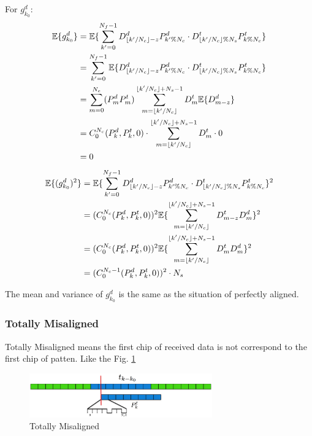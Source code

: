 \documentclass[a4paper]{article}
\begin{document}
For $g^d_{k_0}$:
\begin{align}
	\mathbb{E} \{g^d_{k_0}\} 
	&= \mathbb{E} \{\sum_{k'=0}^{N_f-1} D^d_{\lfloor k'/N_c\rfloor-z} P^d_{k'\%N_c} \cdot D^t_{\lfloor k'/N_c\rfloor\%N_s} P^t_{k\%N_c} \}\\
	&= \sum_{k'=0}^{N_f-1} \mathbb{E} \{ D^d_{\lfloor k'/N_c\rfloor-z} P^d_{k'\%N_c} \cdot D^t_{\lfloor k'/N_c\rfloor\%N_s} P^t_{k\%N_c} \}\\
	&= \sum_{m = 0}^{N_c} (P^d_{m} P^t_{m}) \sum_{m = \lfloor k'/N_c\rfloor}^{\lfloor k'/N_c\rfloor+N_s-1} D^t_{m} \mathbb{E}\{ D^d_{m-z} \}\\
	&= C_0^{N_c}(P_k^d, P_k^t, 0) \cdot \sum_{m = \lfloor k'/N_c\rfloor}^{\lfloor k'/N_c\rfloor+N_s-1} D^t_{m} \cdot0\\
	&= 0
\end{align}
\begin{align}
	\mathbb{E} \{(g^d_{k_0})^2\}
	&= \mathbb{E} \{\sum_{k'=0}^{N_f-1} D^d_{\lfloor k'/N_c\rfloor-z} P^d_{k'\%N_c} \cdot D^t_{\lfloor k'/N_c\rfloor\%N_s} P^t_{k\%N_c} \}^2\\
	&= (C_0^{N_c}(P_k^d, P_k^t, 0))^2 \mathbb{E}\{\sum_{m = \lfloor k'/N_c\rfloor}^{\lfloor k'/N_c\rfloor+N_s-1} D_{m-z}^t D_{m}^d \}^2\\
	&= (C_0^{N_c}(P_k^d, P_k^t, 0))^2 \mathbb{E}\{\sum_{m = \lfloor k'/N_c\rfloor}^{\lfloor k'/N_c\rfloor+N_s-1} D_{m}^t D_{m}^d \}^2\\
	&= (C_0^{N_c-1}(P^d_{k}, P^t_{k}, 0))^2 \cdot N_s
\end{align}

The mean and variance of $g^d_{k_0}$ is the same as the situation of perfectly aligned.

\subsubsection{Totally Misaligned} %
\label{ssub:totally_misaligned}
Totally Misaligned means the first chip of received data is not correspond to the first chip of patten. Like the Fig. \ref{fig:Totally Misaligned}
\begin{figure}[ht]
	\centering
	\includegraphics[width = 3.1in]{figure/totally_misaligned.png}
	\caption{Totally Misaligned}
	\label{fig:Totally Misaligned}
\end{figure}
\end{document}

